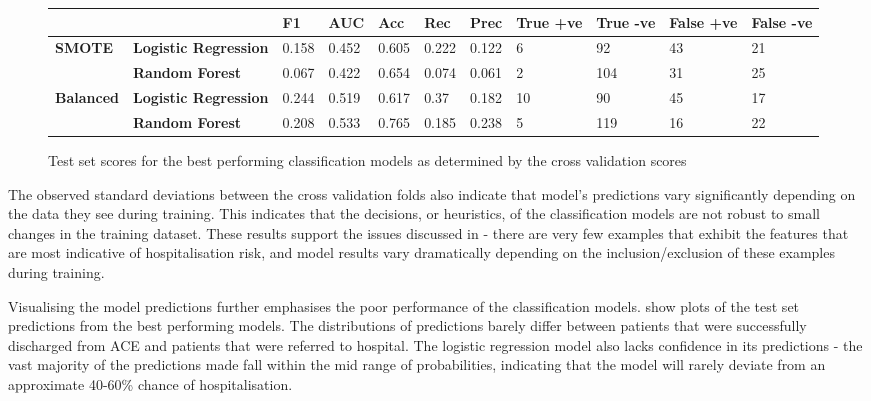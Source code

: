 \begin{figure}[H]
    \renewcommand\arraystretch{1.5}
    \scriptsize
    \centering
    \begin{tabular}{P{13mm} P{16mm} P{7mm} P{7mm} P{7mm} P{7mm} P{7mm} P{7mm} P{7mm} P{7mm} P{7mm} }
        \toprule
        & & \textbf{F1} & \textbf{AUC} & \textbf{Acc} & \textbf{Rec} & \textbf{Prec} & \textbf{True +ve} & \textbf{True -ve} & \textbf{False +ve} & \textbf{False -ve} \\\toprule
        \textbf{SMOTE}    & \textbf{Logistic Regression} & 0.158       & 0.452        & 0.605             & 0.222           & 0.122              & 6                  & 92                 & 43                  & 21                  \\
        \textbf{}         & \textbf{Random Forest}       & 0.067       & 0.422        & 0.654             & 0.074           & 0.061              & 2                  & 104                & 31                  & 25                  \\\midrule
        \textbf{Balanced} & \textbf{Logistic Regression} & 0.244       & 0.519        & 0.617             & 0.37            & 0.182              & 10                 & 90                 & 45                  & 17                  \\
        \textbf{}         & \textbf{Random Forest}       & 0.208       & 0.533        & 0.765             & 0.185           & 0.238              & 5                  & 119                & 16                  & 22 \\\toprule
    \end{tabular}
    \caption[Test set results for classification models]{Test set scores for the best performing classification models as determined by the cross validation scores}
    \label{fig:test-results}
\end{figure}

The observed standard deviations between the cross validation folds also indicate that model's predictions vary significantly depending on the data they see during training. This indicates that the decisions, or heuristics, of the classification models are not robust to small changes in the training dataset. These results support the issues discussed in  - there are very few examples that exhibit the features that are most indicative of hospitalisation risk, and model results vary dramatically depending on the inclusion/exclusion of these examples during training.

Visualising the model predictions further emphasises the poor performance of the classification models.  show plots of the test set predictions from the best performing models. The distributions of predictions barely differ between patients that were successfully discharged from ACE and patients that were referred to hospital. The logistic regression model also lacks confidence in its predictions - the vast majority of the predictions made fall within the mid range of probabilities, indicating that the model will rarely deviate from an approximate 40-60\% chance of hospitalisation.


